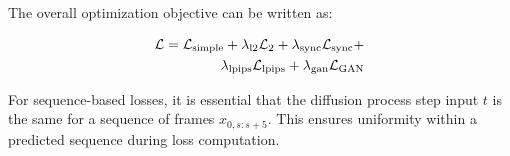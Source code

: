 The overall optimization objective can be written as:

\begin{equation}
\label{eq:L_all}
\begin{aligned}
\mathcal{L}=\mathcal{L}_{\text{simple}} + \lambda_{\text{l2}}\mathcal{L}_{2} +  \lambda_{\text{sync}}\mathcal{L}_{\text{sync}}+ \\ \lambda_{\text{lpips}}\mathcal{L}_{\text{\text{lpips}}}+\lambda_{\text{gan}}\mathcal{L}_{\text{GAN}}
\end{aligned}
\end{equation}


For sequence-based losses, it is essential that the diffusion process step input $t$ is the same for a sequence of frames $x_{0,s:s+5}$. This ensures uniformity within a predicted sequence during loss computation. 


